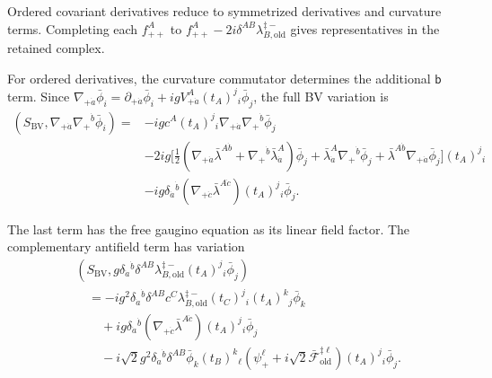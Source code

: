 \documentclass[11pt]{article}
\numberwithin{equation}{section}
\numberwithin{figure}{section}
\numberwithin{table}{section}
\begin{document}
\begin{proofbox}
Ordered covariant derivatives reduce to symmetrized derivatives and curvature terms. Completing each $f_{++}^A$ to $f_{++}^A-2i\delta^{AB}\lambda_{B,\mathrm{old}}^{\ddagger-}$ gives representatives in the retained complex.

For ordered derivatives, the curvature commutator determines the additional $\mathsf b$ term. Since $\nabla_{+\dot a}\bar\phi_i=\partial_{+\dot a}\bar\phi_i +igV_{+\dot a}^A(t_A)^j{}_i\bar\phi_j$, the full BV variation is
\begin{equation}\label{eq-ordered-scalar-variation}
\begin{aligned}
(S_{\mathrm{BV}},\nabla_{+\dot a}\nabla_+{}^{\dot b}\bar\phi_i)
={}&-igc^A(t_A)^j{}_i\nabla_{+\dot a}\nabla_+{}^{\dot b}\bar\phi_j\\
&-2ig\Big[
 \frac12\left(\nabla_{+\dot a}\bar\lambda^{A\dot b}
 +\nabla_+{}^{\dot b}\bar\lambda_{\dot a}^A\right)\bar\phi_j
 +\bar\lambda_{\dot a}^A\nabla_+{}^{\dot b}\bar\phi_j
 +\bar\lambda^{A\dot b}\nabla_{+\dot a}\bar\phi_j
 \Big](t_A)^j{}_i\\
&-ig\delta_{\dot a}{}^{\dot b}
 (\nabla_{+\dot c}\bar\lambda^{A\dot c})
 (t_A)^j{}_i\bar\phi_j.
\end{aligned}
\end{equation}

The last term has the free gaugino equation as its linear field factor. The complementary antifield term has variation
\begin{equation}\label{eq-ordered-scalar-complement}
\begin{aligned}
&\left(S_{\mathrm{BV}},
g\delta_{\dot a}{}^{\dot b}\delta^{AB}\lambda_{B,\mathrm{old}}^{\ddagger-}
 (t_A)^j{}_i\bar\phi_j\right)
\\
&\quad=-ig^2\delta_{\dot a}{}^{\dot b}\delta^{AB}c^C
\lambda_{B,\mathrm{old}}^{\ddagger-}(t_C)^j{}_i(t_A)^k{}_j\bar\phi_k\\
&\qquad+ig\delta_{\dot a}{}^{\dot b}
 (\nabla_{+\dot c}\bar\lambda^{A\dot c})(t_A)^j{}_i\bar\phi_j\\
&\qquad-i\sqrt2g^2\delta_{\dot a}{}^{\dot b}\delta^{AB}
 \bar\phi_k(t_B)^k{}_\ell
 \left(\psi_+^\ell+i\sqrt2\bar{\mathcal F}_{\mathrm{old}}^{\ddagger\ell}\right)
 (t_A)^j{}_i\bar\phi_j.
\end{aligned}
\end{equation}


\end{proofbox}
\end{document}
